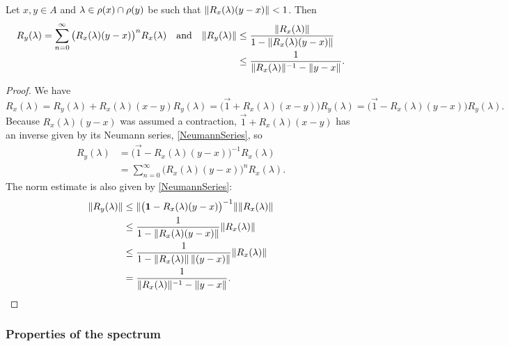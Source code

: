 \begin{corollary}
Let $x,y\in A$ and $\lambda\in \rho(x)\cap \rho(y)$ be such that $\lVert R_x(\lambda)(y-x)\rVert<1$. Then 
\[ R_y(\lambda) = \sum_{n=0}^\infty \big(R_x(\lambda)(y-x)\big)^nR_x(\lambda) \quad\text{and}\quad \begin{aligned}[t]\lVert R_y(\lambda)\rVert &\leq \frac{\lVert R_x(\lambda)\rVert}{1 - \lVert R_x(\lambda)(y-x)\rVert}\\
&\leq \frac{1}{\lVert R_x(\lambda)\rVert^{-1} - \lVert y-x\rVert}.\end{aligned} \]
\end{corollary}
\begin{proof}
We have
\[ R_x(\lambda) = R_y(\lambda) + R_x(\lambda)(x-y)R_y(\lambda) = \big(\vec{1} + R_x(\lambda)(x-y)\big)R_y(\lambda) = \big(\vec{1} - R_x(\lambda)(y-x)\big)R_y(\lambda). \]
Because $R_x(\lambda)(y-x)$ was assumed a contraction, $\vec{1} + R_x(\lambda)(x-y)$ has an inverse given by its Neumann series, \ref{NeumannSeries}, so
\begin{align*}
R_y(\lambda) &= \big(\vec{1} - R_x(\lambda)(y-x)\big)^{-1} R_x(\lambda) \\
&= \sum_{n=0}^\infty \big(R_x(\lambda)(y-x)\big)^n R_x(\lambda).
\end{align*}
The norm estimate is also given by \ref{NeumannSeries}:
\begin{align*}
\lVert R_y(\lambda)\rVert &\leq \lVert\big(\boldsymbol{\mathrm{1}} - R_x(\lambda)(y-x)\big)^{-1}\rVert\lVert R_x(\lambda)\rVert \\
&\leq \frac{1}{1 - \lVert R_x(\lambda)(y-x)\rVert}\lVert R_x(\lambda)\rVert \\
&\leq \frac{1}{1 - \lVert R_x(\lambda)\rVert\,\lVert(y-x)\rVert}\lVert R_x(\lambda)\rVert \\
&= \frac{1}{\lVert R_x(\lambda)\rVert^{-1} - \lVert y-x\rVert}.
\end{align*}
\end{proof}

\subsubsection{Properties of the spectrum}

